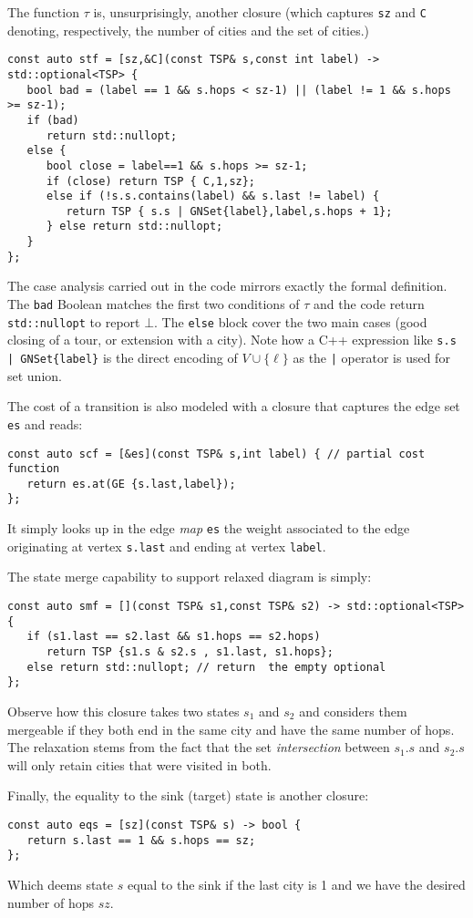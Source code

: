 \documentclass[11pt]{article}
\begin{document}
The function \(\tau\) is, unsurprisingly, another closure (which captures \texttt{sz} and \texttt{C} denoting, respectively, the number of cities and the set of cities.)
\begin{verbatim}
const auto stf = [sz,&C](const TSP& s,const int label) -> std::optional<TSP> {
   bool bad = (label == 1 && s.hops < sz-1) || (label != 1 && s.hops >= sz-1);
   if (bad)
      return std::nullopt;
   else {
      bool close = label==1 && s.hops >= sz-1;
      if (close) return TSP { C,1,sz};
      else if (!s.s.contains(label) && s.last != label) {
         return TSP { s.s | GNSet{label},label,s.hops + 1};
      } else return std::nullopt;
   }      
};
\end{verbatim}
The case analysis carried out in the code mirrors exactly the formal definition. The \texttt{bad} Boolean matches the first two conditions of \(\tau\) and the code return \texttt{std::nullopt} to report \(\bot\). The \texttt{else} block cover the two main cases (good closing of a tour, or extension with a city). Note how a C++ expression like \texttt{s.s | GNSet\{label\}}
is the direct encoding of \(V \cup \{\ell\}\) as the \texttt{|} operator is used for set union.

The cost of a transition is also modeled with a closure that captures the edge set \texttt{es} and reads:
\begin{verbatim}
const auto scf = [&es](const TSP& s,int label) { // partial cost function 
   return es.at(GE {s.last,label});
};
\end{verbatim}
It simply looks up in the edge \emph{map} \texttt{es} the weight associated to the edge originating at vertex \texttt{s.last} and ending at vertex \texttt{label}.

The state merge capability to support relaxed diagram is simply:
\begin{verbatim}
const auto smf = [](const TSP& s1,const TSP& s2) -> std::optional<TSP> {
   if (s1.last == s2.last && s1.hops == s2.hops) 
      return TSP {s1.s & s2.s , s1.last, s1.hops};
   else return std::nullopt; // return  the empty optional
};
\end{verbatim}
Observe how this closure takes two states \(s_1\) and \(s_2\) and considers them
mergeable if they both end in the same city and have the same number of hops. The relaxation stems from the fact that the set \emph{intersection} between \(s_1.s\) and \(s_2.s\) will only retain cities that were visited in both.

Finally, the equality to the sink (target) state is another closure:
\begin{verbatim}
const auto eqs = [sz](const TSP& s) -> bool {
   return s.last == 1 && s.hops == sz;
};  
\end{verbatim}
Which deems state \(s\) equal to the sink if the last city is 1 and we have the desired number of hops \(sz\). 
\end{document}
